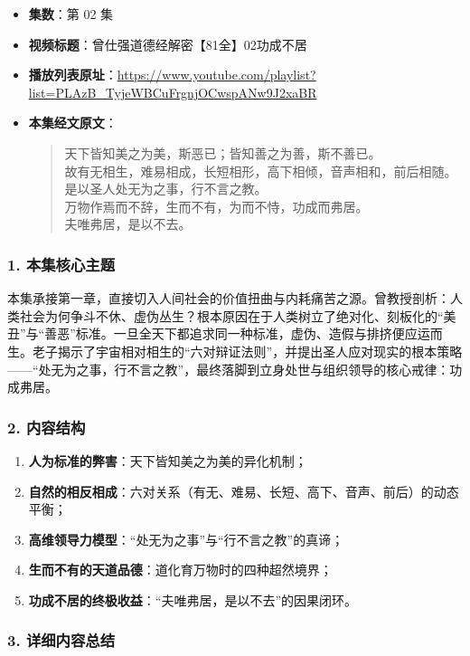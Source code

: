 \begin{itemize}
    \item \textbf{集数}：第 02 集
    \item \textbf{视频标题}：曾仕强道德经解密【81全】02功成不居
    \item \textbf{播放列表原址}：\url{https://www.youtube.com/playlist?list=PLAzB_TyjeWBCuFrgnjOCwspANw9J2xaBR}
    \item \textbf{本集经文原文}：
    \begin{quote}\kaishu
    天下皆知美之为美，斯恶已；皆知善之为善，斯不善已。\\
    故有无相生，难易相成，长短相形，高下相倾，音声相和，前后相随。\\
    是以圣人处无为之事，行不言之教。\\
    万物作焉而不辞，生而不有，为而不恃，功成而弗居。\\
    夫唯弗居，是以不去。
    \end{quote}
\end{itemize}

\subsubsection{1. 本集核心主题}
本集承接第一章，直接切入人间社会的价值扭曲与内耗痛苦之源。曾教授剖析：人类社会为何争斗不休、虚伪丛生？根本原因在于人类树立了绝对化、刻板化的“美丑”与“善恶”标准。一旦全天下都追求同一种标准，虚伪、造假与排挤便应运而生。老子揭示了宇宙相对相生的“六对辩证法则”，并提出圣人应对现实的根本策略——“处无为之事，行不言之教”，最终落脚到立身处世与组织领导的核心戒律：功成弗居。

\subsubsection{2. 内容结构}
\begin{enumerate}
    \item \textbf{人为标准的弊害}：天下皆知美之为美的异化机制；
    \item \textbf{自然的相反相成}：六对关系（有无、难易、长短、高下、音声、前后）的动态平衡；
    \item \textbf{高维领导力模型}：“处无为之事”与“行不言之教”的真谛；
    \item \textbf{生而不有的天道品德}：道化育万物时的四种超然境界；
    \item \textbf{功成不居的终极收益}：“夫唯弗居，是以不去”的因果闭环。
\end{enumerate}

\subsubsection{3. 详细内容总结}

